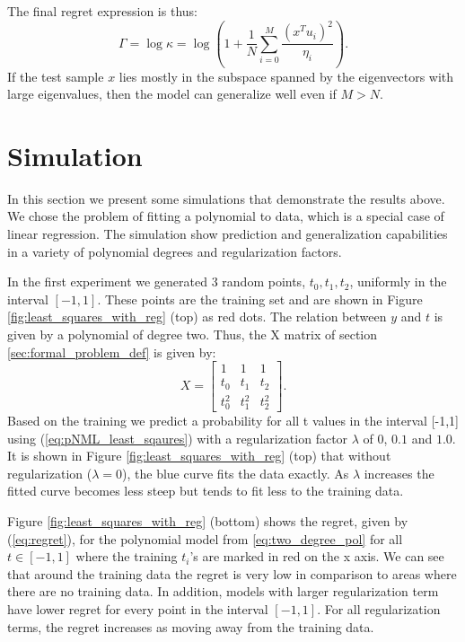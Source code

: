 \documentclass[conference,letterpaper]{IEEEtran}
\begin{document}
The final regret expression is thus:
\begin{equation}
\Gamma = \log \kappa = \log \left(1 + \frac{1}{N} \sum_{i=0}^{M} \frac{\left(x^Tu_i\right)^2 }{\eta_i}\right).
\end{equation}
If the test sample $x$ lies mostly in the subspace spanned by the eigenvectors with large eigenvalues, then the model can generalize well even if $M>N$.

\section{Simulation} \label{sec:simulation}
In this section we present some simulations that demonstrate the results above. We chose the problem of fitting a polynomial to data, which is a special case of linear regression.
The simulation show prediction and generalization capabilities in a variety of polynomial degrees and regularization factors.

In the first experiment we generated 3 random points, $t_0,t_1,t_2$, uniformly in the interval $[-1, 1]$. These points are the training set and are shown in Figure \ref{fig:least_squares_with_reg} (top) as red dots. 
The relation between $y$ and $t$ is given by a polynomial of degree two.
Thus, the X matrix of section \ref{sec:formal_problem_def} is given by:
\begin{equation} \label{eq:two_degree_pol}
X = 
\begin{bmatrix}
1 & 1 & 1 \\
t_0 & t_1 & t_2 \\
t_0^2 & t_1^2 & t_2^2 
\end{bmatrix}.
\end{equation}
Based on the training we predict a probability for all t values in the interval [-1,1] using (\ref{eq:pNML_least_sqaures}) with a regularization factor $\lambda$ of $0$, $0.1$ and $1.0$. 
It is shown in Figure \ref{fig:least_squares_with_reg} (top) that without regularization ($\lambda=0$), the blue curve fits the data exactly. As $\lambda$ increases the fitted curve becomes less steep but tends to fit less to the training data.

Figure \ref{fig:least_squares_with_reg} (bottom) shows the regret, given by (\ref{eq:regret}), for the polynomial model from \eqref{eq:two_degree_pol} for all $t\in[-1,1]$ where the training $t_i$'s are marked in red on the x axis. 
We can see that around the training data the regret is very low in comparison to areas where there are no training data. 
In addition, models with larger regularization term have lower regret for every point in the interval $[-1,1]$.
For all regularization terms, the regret increases as moving away from the training data.
\end{document}

